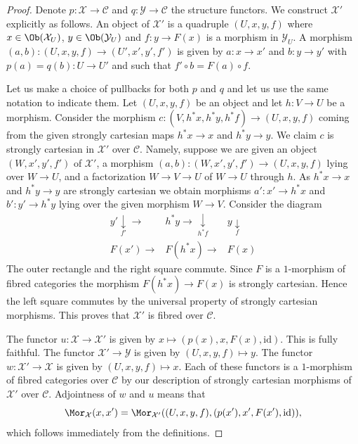\begin{proof}
Denote $p : \mathcal{X} \to \mathcal{C}$ and $q : \mathcal{Y} \to \mathcal{C}$
the structure functors. We construct $\mathcal{X}'$ explicitly as follows.
An object of $\mathcal{X}'$ is a quadruple $(U, x, y, f)$ where
$x \in \Ob(\mathcal{X}_U)$, $y \in \Ob(\mathcal{Y}_U)$
and $f : y \to F(x)$ is a morphism in $\mathcal{Y}_U$.
A morphism $(a, b) : (U, x, y, f) \to (U', x', y', f')$ is given
by $a : x \to x'$ and $b : y \to y'$ with $p(a) = q(b) : U \to U'$
and such that $f' \circ b = F(a) \circ f$.

\medskip\noindent
Let us make a choice of pullbacks for both $p$ and $q$ and let us
use the same notation to indicate them.
Let $(U, x, y, f)$ be an object and let $h : V \to U$ be a morphism.
Consider the morphism $c : (V, h^*x, h^*y, h^*f) \to (U, x, y, f)$
coming from the given strongly cartesian maps $h^*x \to x$ and $h^*y \to y$.
We claim $c$ is strongly cartesian in $\mathcal{X}'$ over $\mathcal{C}$.
Namely, suppose we are given an object $(W, x', y', f')$ of $\mathcal{X}'$,
a morphism $(a, b) : (W, x', y', f') \to (U, x, y, f)$ lying over
$W \to U$, and a factorization $W \to V \to U$ of $W \to U$ through $h$.
As $h^*x \to x$ and $h^*y \to y$ are strongly cartesian we obtain morphisms
$a' : x' \to h^*x$ and $b' : y' \to h^*y$ lying over the given morphism
$W \to V$. Consider the diagram
$$
\begin{array}{ccc}y' \underset{f'}{\downarrow}\longrightarrow & h^*y \longrightarrow\underset{h^*f}{\downarrow} & y \underset{f}{\downarrow} \\ F(x') \longrightarrow & F(h^*x) \longrightarrow & F(x)\end{array}
$$
The outer rectangle and the right square commute.
Since $F$ is a $1$-morphism of fibred categories the morphism
$F(h^*x) \to F(x)$ is strongly cartesian.
Hence the left square commutes by the universal property
of strongly cartesian morphisms. This proves that $\mathcal{X}'$
is fibred over $\mathcal{C}$.

\medskip\noindent
The functor $u : \mathcal{X} \to \mathcal{X}'$ is given by
$x \mapsto (p(x), x, F(x), \text{id})$. This is fully faithful.
The functor $\mathcal{X}' \to \mathcal{Y}$ is given by
$(U, x, y, f) \mapsto y$. The functor $w : \mathcal{X}' \to \mathcal{X}$
is given by $(U, x, y, f) \mapsto x$. Each of these functors is
a $1$-morphism of fibred categories over $\mathcal{C}$ by our
description of strongly cartesian morphisms of $\mathcal{X}'$ over
$\mathcal{C}$. Adjointness of $w$ and $u$ means that
$$
\Mor_\mathcal{X}(x, x') =
\Mor_{\mathcal{X}'}((U, x, y, f), (p(x'), x', F(x'), \text{id})),
$$
which follows immediately from the definitions.


\end{proof}
